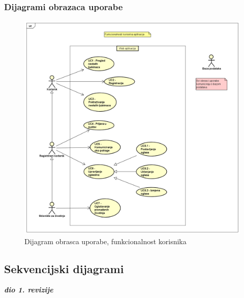 				
					
				\pagebreak
				\subsubsection{Dijagrami obrazaca uporabe}
				
					\begin{figure}[htb]
						\centering
						\includegraphics[width=\textwidth]{slike/funkcionalnosti_korisnika.png}
						\caption{Dijagram obrasca uporabe, funkcionalnost korisnika}
					\end{figure}		
				
			\pagebreak
			\subsection{Sekvencijski dijagrami}

				\textbf{\textit{dio 1. revizije}}\\

